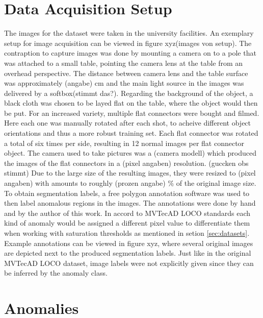 \section{Data Acquisition Setup}
\label{sec:faltconnectordataacquisiton}

The images for the dataset were taken in the university facilities. An exemplary setup for image acquisition can be viewed in figure xyz(images von setup). The contraption to capture images was 
done by mounting a camera on to a pole that was attached to a small table, pointing the camera lens at the table from an overhead perspective. The distance between camera lens and the table surface was approximately (angabe) cm and the main light source in the 
images was delivered by a softbox(stimmt das?). Regarding the background of the object, a black cloth was chosen to be layed flat on the table, where the object would then be put. For 
an increased variety, multiple flat connectors were bought and filmed. Here each one was manually rotated after each shot, to acheive different object orientations and thus a more robust training 
set. Each flat connector was rotated a total of six times per side, resulting in 12 normal images per flat connector object. \newline
The camera used to take pictures was a (camera modell) which produced the images of the flat connectors in a (pixel angaben) resolution. (guccken obs stimmt) Due to the large size of the resulting 
images, they were resized to (pixel angaben) with amounts to roughly (prozen angabe) \% of the original image size.\newline
To obtain segmentation labels, a free polygon annotation software was used to then label anomalous regions in the images. The annotations were done by hand and by the author of this work. In accord to 
MVTecAD LOCO standards \cite{LOCODentsAndScratchesBergmann2022} each kind of anomaly would be assigned a different pixel value to differentiate them when working with saturation thresholds 
as mentioned in setion \ref{sec:datasets}. Example annotations can be viewed in figure xyz, where several original images are depicted next to the produced segmentation labels. Just like in the 
original MVTecAD LOCO dataset, image labels were not explicitly given since they can be inferred by the anomaly class.


\section{Anomalies}
\label{sec:flatconnectoranomalies}

